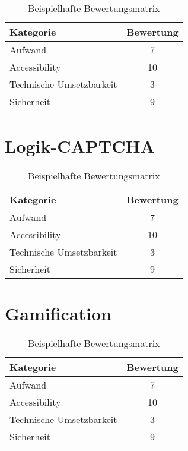 \begin{table}[h!]
    \caption{Beispielhafte Bewertungsmatrix}
    \begin{center}
        \begin{tabular}{l|c}
            Kategorie                       & Bewertung \\\hline
            Aufwand                         & 7         \\
            Accessibility                   & 10        \\
            Technische Umsetzbarkeit        & 3         \\
            Sicherheit                      & 9         
        \end{tabular}
    \end{center}
\end{table}

\section{Logik-CAPTCHA}

\begin{table}[h!]
    \caption{Beispielhafte Bewertungsmatrix}
    \begin{center}
        \begin{tabular}{l|c}
            Kategorie                       & Bewertung \\\hline
            Aufwand                         & 7         \\
            Accessibility                   & 10        \\
            Technische Umsetzbarkeit        & 3         \\
            Sicherheit                      & 9         
        \end{tabular}
    \end{center}
\end{table}

\section{Gamification}

\begin{table}[h!]
    \caption{Beispielhafte Bewertungsmatrix}
    \begin{center}
        \begin{tabular}{l|c}
            Kategorie                       & Bewertung \\\hline
            Aufwand                         & 7         \\
            Accessibility                   & 10        \\
            Technische Umsetzbarkeit        & 3         \\
            Sicherheit                      & 9         
        \end{tabular}
    \end{center}
\end{table}

